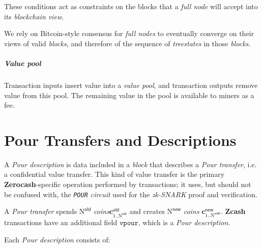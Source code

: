 \documentclass{article}
\newcommand{\changedcolor}{magenta}
\newcommand{\setchanged}{\color{\changedcolor}}
\newcommand{\changed}[1]{{\setchanged{#1}}}
\newcommand{\term}[1]{\textsl{#1}\xspace}
\newcommand{\termbf}[1]{\textbf{#1}\xspace}
\newcommand{\Zcash}{\termbf{Zcash}}
\newcommand{\Zerocash}{\termbf{Zerocash}}
\newcommand{\coins}{\term{coins}}
\newcommand{\PourDescription}{\term{Pour description}}
\newcommand{\sequenceOfPourDescriptions}{\changed{sequence of} \PourDescription\changed{\term{s}}}
\newcommand{\PourTransfer}{\term{Pour transfer}}
\newcommand{\fullnode}{\term{full node}}
\newcommand{\fullnodes}{\term{full nodes}}
\newcommand{\block}{\term{block}}
\newcommand{\blocks}{\term{blocks}}
\newcommand{\blockchainview}{\term{blockchain view}}
\newcommand{\treestates}{\term{treestates}}
\newcommand{\zkSNARK}{\term{zk-SNARK}}
\newcommand{\vpour}{\mathtt{vpour}}
\newcommand{\NOld}{\mathrm{N}^\mathsf{old}}
\newcommand{\NNew}{\mathrm{N}^\mathsf{new}}
\newcommand{\PourCircuit}{\term{\texttt{POUR} circuit}}
\newcommand{\cOld}[1]{\mathbf{c}_{#1}^\mathsf{old}}
\newcommand{\cNew}[1]{\mathbf{c}_{#1}^\mathsf{new}}
\begin{document}
These conditions act as constraints on the blocks that a \fullnode will
accept into its \blockchainview.

We rely on Bitcoin-style consensus for \fullnodes to eventually converge on their 
views of valid \blocks, and therefore of the sequence of \treestates in those 
\blocks.


\subparagraph{Value pool}

Transaction inputs insert value into a \term{value pool}, and transaction outputs 
remove value from this pool. The remaining value in the pool is available to miners 
as a fee.

\section{Pour Transfers and Descriptions}

A \PourDescription is data included in a \block that describes a \PourTransfer,
i.e. a confidential value transfer. This kind of value transfer is the primary
\Zerocash-specific operation performed by transactions; it uses, but should not be
confused with, the \PourCircuit used for the \zkSNARK proof and verification.

A \PourTransfer spends $\NOld$ \coins $\cOld{1..\NOld}$ and creates $\NNew$ \coins
$\cNew{1..\NNew}$. \Zcash transactions have an additional field $\vpour$, which is
a \sequenceOfPourDescriptions.

Each \PourDescription consists of:
\end{document}
